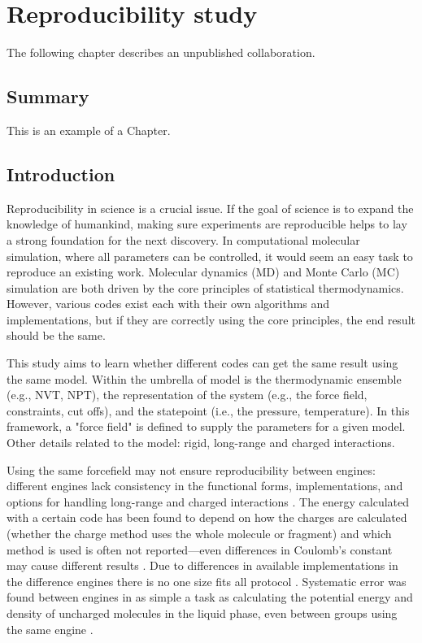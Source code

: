 \chapter{Reproducibility study}
\label{chap:reproducibility}

The following chapter describes an unpublished collaboration.

\section{Summary}
 
This is an example of a Chapter. 

\section{Introduction}
Reproducibility in science is a crucial issue.
If the goal of science is to expand the knowledge of humankind, making sure experiments are reproducible helps to lay a strong foundation for the next discovery.
In computational molecular simulation, where all parameters can be controlled, it would seem an easy task to reproduce an existing work.
Molecular dynamics (MD) and Monte Carlo (MC) simulation are both driven by the core principles of statistical thermodynamics.
However, various codes exist each with their own algorithms and implementations, but if they are correctly using the core principles, the end result should be the same.

This study aims to learn whether different codes can get the same result using the same model.
Within the umbrella of model is the thermodynamic ensemble (e.g., NVT, NPT), the representation of the system (e.g., the force field, constraints, cut offs), and the statepoint (i.e., the pressure, temperature).
In this framework, a "force field" is defined to supply the parameters for a given model.
Other details related to the model: rigid, long-range and charged interactions.

Using the same forcefield may not ensure reproducibility between engines: different engines lack consistency in the functional forms, implementations, and options for handling long-range and charged interactions \citep{Rizzi2020}. 
The energy calculated with a certain code has been found to depend on how the charges are calculated (whether the charge method uses the whole molecule or fragment) and which method is used is often not reported---even differences in Coulomb's constant may cause different results \citep{Shirts2017}.
Due to differences in available implementations in the difference engines there is no one size fits all protocol \citep{Loeffler2018}.
Systematic error was found between engines in as simple a task as calculating the potential energy and density of uncharged molecules in the liquid phase, even between groups using the same engine \citep{Schappals2017}.

